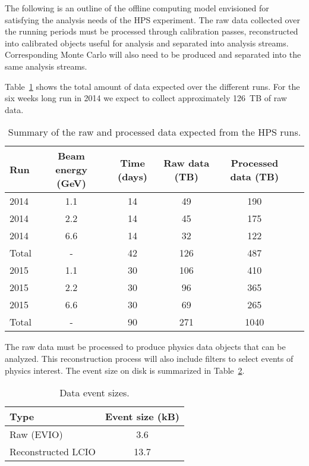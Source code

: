 
The following is an outline of the offline computing model envisioned for satisfying the analysis needs of the HPS experiment. The raw data collected over the running periods must be processed through calibration passes, reconstructed into calibrated objects useful for analysis and separated into analysis streams. Corresponding Monte Carlo will also need to be produced and separated into the same analysis streams.

Table~\ref{tab:data_rates} shows 
the total amount of data expected over the 
different runs. For the six weeks long run in 2014 we expect to collect approximately 126~TB of raw data.
\begin{table}[]
\centering
\begin{tabular}{|l|c|c|c|c|c|}
\hline
Run & Beam energy (GeV) & Time (days) & Raw data (TB) & Processed data (TB)\\
\hline
2014 & 1.1 & 14 & 49 & 190 \\
2014 & 2.2 & 14 & 45 & 175  \\
2014 & 6.6 & 14 & 32 & 122  \\
\hline
Total & - & 42 &  126  & 487 \\
\hline
2015 & 1.1 & 30 & 106 & 410 \\
2015 & 2.2 & 30 & 96 & 365 \\
2015 & 6.6 & 30 & 69 & 265 \\
\hline
Total & - & 90 & 271& 1040 \\
\hline
\end{tabular}
\caption{{\small Summary of the raw and processed data expected from the HPS runs. }}
\label{tab:data_rates}
\end{table}
The raw data must be processed to produce physics data objects that can be analyzed. This reconstruction process will also include filters to select events of physics interest. The event size on disk is summarized 
in Table~\ref{tab:raw_data_size}. 
\begin{table}[]
\centering
\begin{tabular}{|l|c|}
\hline
Type & Event size (kB) \\ 
\hline
Raw (EVIO)  &  3.6 \\
\hline
Reconstructed LCIO & 13.7 \\
\hline
\end{tabular}
\caption{{\small Data event sizes. }}
\label{tab:raw_data_size}
\end{table}

